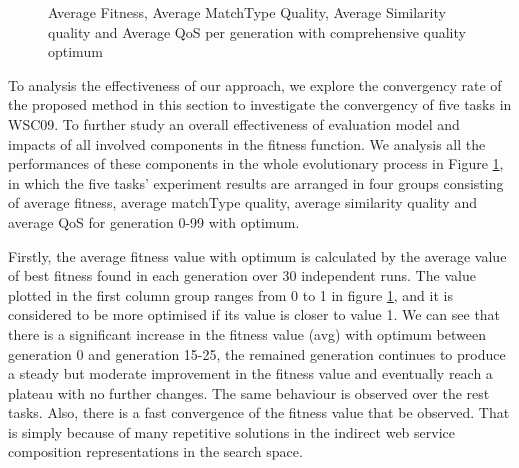 \documentclass{llncs}
\begin{document}
\begin{figure}[h]
\centerline{
}
 \caption{Average Fitness, Average MatchType Quality, Average Similarity quality and Average QoS per generation with comprehensive quality optimum}
 \label{exp_fitnessvalue}
\end{figure}

To analysis the effectiveness of our approach, we explore the convergency rate of the proposed method in this section to investigate the convergency of five tasks in WSC09. To further study an overall effectiveness of evaluation model and impacts of all involved components in the fitness function. We analysis all the performances of these components in the whole evolutionary process in Figure \ref{exp_fitnessvalue}, in which the five tasks' experiment results are arranged in four groups consisting of average fitness, average matchType quality, average similarity quality and average QoS for generation 0-99 with optimum.

Firstly, the average fitness value with optimum is calculated by the average value of best fitness found in each generation over 30 independent runs. The value plotted in the first column group ranges from 0 to 1 in figure \ref{exp_fitnessvalue}, and it is considered to be more optimised if its value is closer to value 1. We can see that there is a significant increase in the fitness value (avg) with optimum between generation 0 and generation 15-25, the remained generation continues to produce a steady but moderate improvement in the fitness value and eventually reach a plateau with no further changes. The same behaviour is observed over the rest tasks. Also, there is a fast convergence of the fitness value that be observed. That is simply because of many repetitive solutions in the indirect web service composition representations in the search space.
\end{document}
